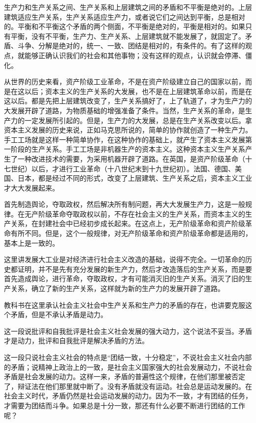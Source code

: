 生产力和生产关系之间、生产关系和上层建筑之间的矛盾和不平衡是绝对的。上层建筑适应生产关系，生产关系适应生产力，或者说它们之间达到平衡，总是相对的。平衡和不平衡这个矛盾的两个侧面，不平衡是绝对的，平衡是相对的。如果只有平衡，没有不平衡，生产力、生产关系、上层建筑就不能发展了，就固定了。矛盾、斗争、分解是绝对的，统一、一致、团结是相对的，有条件的。有了这样的观点，就能够正确认识我们的社会和其他事物；没有这样的观点，认识就会停滞、僵化。

从世界的历史来看，资产阶级工业革命，不是在资产阶级建立自己的国家以前，而是在这以后；资本主义的生产关系的大发展，也不是在上层建筑革命以前，而是在这以后。都是先把上层建筑改变了，生产关系搞好了，上了轨道了，才为生产力的大发展开辟了道路，为物质基础的增强准备了条件。当然，生产关系的革命，是生产力的一定发展所引起的。但是，生产力的大发展，总是在生产关系改变以后。拿资本主义发展的历史来说，正如马克思所说的，简单的协作就创造了一种生产力。手工工场就是这样一种简单协作，在这种协作的基础上，就产生了资本主义发展第一阶段的生产关系。手工工场是非机器生产的资本主义。这种资本主义生产关系产生了一种改进技术的需要，为采用机器开辟了道路。在英国，是资产阶级革命（十七世纪）以后，才进行工业革命（十八世纪末到十九世纪初）。法国、德国、美国、日本，都是经过不同的形式，改变了上层建筑、生产关系之后，资本主义工业才大大发展起来。

首先制造舆论，夺取政权，然后解决所有制问题，再大大发展生产力，这是一般规律。在无产阶级革命夺取政权以前，不存在社会主义的生产关系，而资本主义的生产关系，在封建社会中已经初步成长起来。在这点上，无产阶级革命和资产阶级革命有所不同。但是，这个一般规律，对无产阶级革命和资产阶级革命都是适用的，基本上是一致的。

这里讲发展大工业是对经济进行社会主义改造的基础，说得不完全。一切革命的历史都证明，并不是先有充分发展的新生产力，然后才改造落后的生产关系，而是要首先造成舆论，进行革命，夺取政权，才有可能消灭旧的生产关系。消灭了旧的生产关系，确立了新的生产关系，这样就为新的生产力的发展开辟了道路。

教科书在这里承认社会主义社会中生产关系和生产力的矛盾的存在，也讲要克服这个矛盾，但是不承认矛盾是动力。

这一段说批评和自我批评是社会主义社会发展的强大动力，这个说法不妥当。矛盾才是动力，批评和自我批评是解决矛盾的方法。

这一段只说社会主义社会的特点是“团结一致，十分稳定”，不说社会主义社会内部的矛盾；说精神上政治上的一致，是社会主义国家强大的社会发展动力，不说社会矛盾是社会发展的动力。这样一来，矛盾的普遍性这个规律，在他们那里被否定了，辩证法在他们那里就中断了。没有矛盾就没有运动。社会总是运动发展的。在社会主义时代，矛盾仍然是社会运动发展的动力。因为不一致，才有团结的任务，才需要为团结而斗争。如果总是十分一致，那还有什么必要不断进行团结的工作呢？

